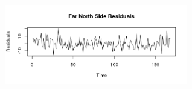 \documentclass{article} %
\begin{document}
\begin{center}
\begin{figure}[H]
\includegraphics[height=50mm, width=80mm]{Plots/far_north_resids.png}
\end{figure}
 \end{center}
 

 
\end{document}
